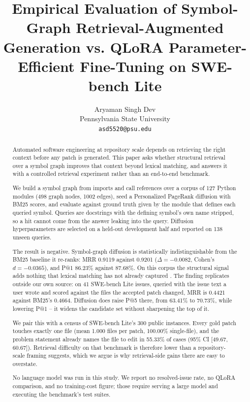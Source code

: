 \documentclass[10pt,twocolumn,letterpaper]{article}
\begin{document}
\title{Empirical Evaluation of Symbol-Graph Retrieval-Augmented Generation vs. QLoRA Parameter-Efficient Fine-Tuning on SWE-bench Lite}

\author{
Aryaman Singh Dev\\
Pennsylvania State University \\
\texttt{asd5520@psu.edu}
}

\maketitle

\begin{abstract}
Automated software engineering at repository scale depends on retrieving the right context before any patch is generated. This paper asks whether structural retrieval over a symbol graph improves that context beyond lexical matching, and answers it with a controlled retrieval experiment rather than an end-to-end benchmark.

We build a symbol graph from imports and call references over a corpus of 127 Python modules (498 graph nodes, 1002 edges), seed a Personalized PageRank diffusion with BM25 scores, and evaluate against ground truth given by the module that defines each queried symbol. Queries are docstrings with the defining symbol's own name stripped, so a hit cannot come from the answer leaking into the query. Diffusion hyperparameters are selected on a held-out development half and reported on 138 unseen queries.

The result is negative. Symbol-graph diffusion is statistically indistinguishable from the BM25 baseline it re-ranks: MRR 0.9119 against 0.9201 ($\Delta = -0.0082$, Cohen's $d = -0.0365$), and P@1 86.23\% against 87.68\%. On this corpus the structural signal adds nothing that lexical matching has not already captured \cite{arxiv_2501_02497}. The finding replicates outside our own source: on 41 SWE-bench Lite issues, queried with the issue text a user wrote and scored against the files the accepted patch changed, MRR is 0.4421 against BM25's 0.4664. Diffusion does raise P@5 there, from 63.41\% to 70.73\%, while lowering P@1 -- it widens the candidate set without sharpening the top of it.

We pair this with a census of SWE-bench Lite's 300 public instances. Every gold patch touches exactly one file (mean 1.000 files per patch, 100.00\% single-file), and the problem statement already names the file to edit in 55.33\% of cases (95\% CI [49.67, 60.67]). Retrieval difficulty on that benchmark is therefore lower than a repository-scale framing suggests, which we argue is why retrieval-side gains there are easy to overstate.

No language model was run in this study. We report no resolved-issue rate, no QLoRA comparison, and no training-cost figure; those require serving a large model and executing the benchmark's test suites.
\end{abstract}
\end{document}
